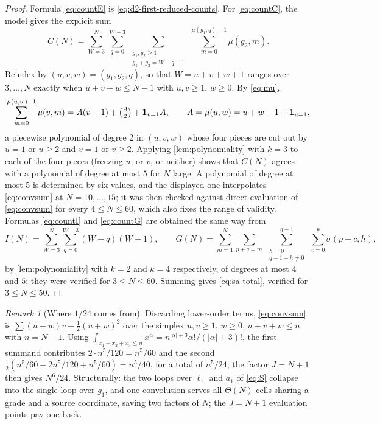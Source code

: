 \documentclass[11pt,reqno]{amsart}
\theoremstyle{definition}
\theoremstyle{remark}
\newtheorem{remark}[theorem]{Remark}
\newcommand{\one}{\mathbf 1}
\begin{document}
\begin{proof}
Formula \eqref{eq:countE} is \eqref{eq:d2-first-reduced-counts}.  For
\eqref{eq:countC}, the model gives the explicit sum
\begin{equation}\label{eq:convsum}
 C(N)=\sum_{W=3}^{N}\ \sum_{q=0}^{W-3}\
 \sum_{\substack{g_1,g_2\geq1\\ g_1+g_2=W-q-1}}\
 \sum_{m=0}^{\mu(g_1,q)-1}\mu(g_2,m).
\end{equation}
Reindex by $(u,v,w)=(g_1,g_2,q)$, so that $W=u+v+w+1$ ranges over
$3,\ldots,N$ exactly when $u+v+w\leq N-1$ with $u,v\geq1$, $w\geq0$.  By
\eqref{eq:mu},
\[
 \sum_{m=0}^{\mu(u,w)-1}\mu(v,m)=A(v-1)+\tbinom A2+\one_{v=1}A,
 \qquad A=\mu(u,w)=u+w-1+\one_{u=1},
\]
a piecewise polynomial of degree $2$ in $(u,v,w)$ whose four pieces are cut
out by $u=1$ or $u\geq2$ and $v=1$ or $v\geq2$.  Applying
\cref{lem:polynomiality} with $k=3$ to each of the four pieces (freezing
$u$, or $v$, or neither) shows that $C(N)$ agrees with a polynomial of
degree at most $5$ for
$N$ large.  A polynomial of degree at most $5$ is determined by six values, and the
displayed one interpolates \eqref{eq:convsum} at $N=10,\ldots,15$; it was
then checked against direct evaluation of \eqref{eq:convsum} for every
$4\leq N\leq60$, which also fixes the range of validity.  Formulas
\eqref{eq:countI} and \eqref{eq:countG} are obtained the same way from
\[
 I(N)=\sum_{W=3}^{N}\sum_{q=0}^{W-3}(W-q)(W-1),\qquad
 G(N)=\sum_{m=1}^{N}\sum_{p+q=m}\ \sum_{\substack{h=0\\ q-1-h\ne0}}^{q-1}
 \ \sum_{c=0}^{p}\sigma(p-c,h),
\]
by \cref{lem:polynomiality} with $k=2$ and $k=4$ respectively, of degrees at
most $4$ and $5$; they were verified for $3\leq N\leq60$.  Summing
gives \eqref{eq:sa-total}, verified for $3\leq N\leq50$.
\end{proof}

\begin{remark}[Where $1/24$ comes from]\label{rem:volume}
Discarding lower-order terms, \eqref{eq:convsum} is
$\sum(u+w)v+\tfrac12(u+w)^2$ over the simplex $u,v\geq1$, $w\geq0$,
$u+v+w\leq n$ with $n=N-1$.  Using
$\int_{x_1+x_2+x_3\leq n}x^{\alpha}=n^{|\alpha|+3}\alpha!/(|\alpha|+3)!$,
the first summand contributes $2\cdot n^5/120=n^5/60$ and the second
$\tfrac12(n^5/60+2n^5/120+n^5/60)=n^5/40$, for a total of $n^5/24$; the
factor $J=N+1$ then gives $N^6/24$.  Structurally: the two loops over
$\ell_1$ and $a_1$ of \eqref{eq:S} collapse into the single loop over
$g_1$, and one convolution serves all $\Theta(N)$ cells sharing a grade and
a source coordinate, saving two factors of $N$; the $J=N+1$ evaluation
points pay one back.
\end{remark}
\end{document}
